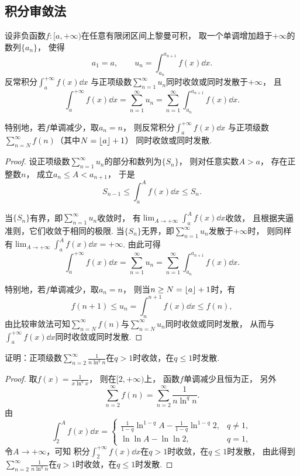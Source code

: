 \subsection{积分审敛法}
\begin{theorem}[积分审敛法]\label{theorem:无穷级数.积分审敛法}
设非负函数\(f\colon[a,+\infty)\)在任意有限闭区间上黎曼可积，
取一个单调增加趋于\(+\infty\)的数列\(\{a_n\}\)，
使得\[
	a_1 = a, \qquad
	u_n = \int_{a_n}^{a_{n+1}} f(x) \dd{x}.
\]
反常积分\(\int_a^{+\infty} f(x) \dd{x}\)
与正项级数\(\sum_{n=1}^\infty u_n\)同时收敛或同时发散于\(+\infty\)，
且\[
	\int_a^{+\infty} f(x) \dd{x}
	= \sum_{n=1}^\infty u_n
	= \sum_{n=1}^\infty \int_{a_n}^{a_{n+1}} f(x) \dd{x}.
\]

特别地，若\(f\)单调减少，取\(a_n = n\)，
则反常积分\(\int_a^{+\infty} f(x) \dd{x}\)
与正项级数\(\sum_{n=N}^\infty f(n)\)（其中\(N=\lfloor a\rfloor+1\)）
同时收敛或同时发散.
\begin{proof}
设正项级数\(\sum_{n=1}^\infty u_n\)的部分和数列为\(\{S_n\}\)，
则对任意实数\(A>a\)，
存在正整数\(n\)，
成立\(a_n \leq A < a_{n+1}\)，
于是\[
	S_{n-1} \leq \int_a^A f(x) \dd{x} \leq S_n.
\]

当\(\{S_n\}\)有界，即\(\sum_{n=1}^\infty u_n\)收敛时，
有\(\lim_{A\to+\infty} \int_a^A f(x) \dd{x}\)收敛，
且根据夹逼准则，它们收敛于相同的极限.
当\(\{S_n\}\)无界，即\(\sum_{n=1}^\infty u_n\)发散于\(+\infty\)时，
则同样有\(\lim_{A\to+\infty} \int_a^A f(x) \dd{x} = +\infty\).
由此可得\[
	\int_a^{+\infty} f(x) \dd{x}
	= \sum_{n=1}^\infty u_n
	= \sum_{n=1}^\infty \int_{a_n}^{a_{n+1}} f(x) \dd{x}.
\]

特别地，若\(f\)单调减少，取\(a_n = n\)，
则当\(n \geq N = \lfloor a\rfloor+1\)时，有\[
	f(n+1) \leq u_n = \int_n^{n+1} f(x) \dd{x} \leq f(n),
\]
由比较审敛法可知\(\sum_{n=N}^\infty f(n)\)与\(\sum_{n=N}^\infty u_n\)同时收敛或同时发散，
从而与\(\int_a^{+\infty} f(x) \dd{x}\)同时收敛或同时发散.
\end{proof}
\end{theorem}

\begin{example}\label{example:无穷级数.对数负次幂级数}
证明：正项级数\(\sum_{n=2}^\infty \frac1{n \ln^q n}\)在\(q>1\)时收敛，在\(q\leq1\)时发散.
\begin{proof}
取\(f(x) = \frac1{x \ln^q x}\)，
则在\([2,+\infty)\)上，
函数\(f\)单调减少且恒为正，
另外\[
	\sum_{n=2}^\infty f(n)
	= \sum_{n=2}^\infty \frac1{n \ln^q n}.
\]
由\[
	\int_2^A f(x) \dd{x}
	= \left\{ \begin{array}{ll}
		\frac1{1-q} \ln^{1-q} A - \frac1{1-q} \ln^{1-q}2, & q\neq1, \\
		\ln\ln A - \ln\ln 2, & q=1,
	\end{array} \right.
\]
令\(A\to+\infty\)，可知
积分\(\int_2^{+\infty} f(x) \dd{x}\)在\(q>1\)时收敛，在\(q\leq1\)时发散，
由此得到\(\sum_{n=2}^\infty \frac1{n \ln^q n}\)在\(q>1\)时收敛，在\(q\leq1\)时发散.
\end{proof}
\end{example}

